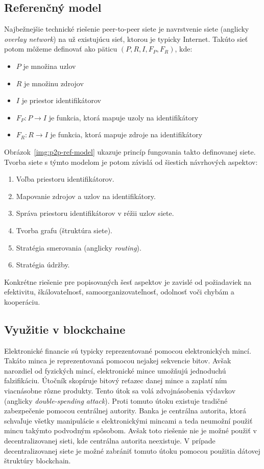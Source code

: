 \subsection{Referenčný model}
Najbežnejšie technické riešenie peer-to-peer siete je navrstvenie siete (anglicky \textit{overlay network}) na už existujúcu sieť, ktorou je typicky Internet. Takúto sieť potom môžeme definovať ako päticu $(P,R,I,F_P,F_R)$, kde:
\begin{itemize}
	\item $P$ je množina uzlov
	\item $R$ je množinu zdrojov
	\item $I$ je priestor identifikátorov
	\item $F_P: P \rightarrow I$ je funkcia, ktorá mapuje uzoly na identifikátory
	\item $F_R: R \rightarrow I$ je funkcia, ktorá mapuje zdroje na identifikátory
\end{itemize}

Obrázok~\ref{img:p2p-ref-model} ukazuje princíp fungovania takto definovanej siete. Tvorba siete s týmto modelom je potom závislá od šiestich návrhových aspektov:
\begin{enumerate}
	\item Voľba priestoru identifikátorov.
	\item Mapovanie zdrojov a uzlov na identifikátory.
	\item Správa priestoru identifikátorov v réžii uzlov siete.
	\item Tvorba grafu (štruktúra siete).
	\item Stratégia smerovania (anglicky \textit{routing}).
	\item Stratégia údržby.
\end{enumerate}
Konkrétne riešenie pre popisovaných šesť aspektov je zavislé od požiadaviek na efektivitu, škálovateľnosť, samoorganizovateľnosť, odolnosť voči chybám a kooperáciu.~\cite{p2pEssence}

\subsection{Využitie v blockchaine}

Elektronické financie sú typicky reprezentované pomocou elektronických mincí. Takáto minca je reprezentovaná pomocou nejakej sekvencie bitov. Avšak narozdiel od fyzických mincí, elektronické mince umožňujú jednoduchú falzifikáciu. Útočník skopíruje bitový reťazec danej mince a zaplatí ním viacnásobne rôzne produkty. Tento útok sa volá zdvojnásobenia výdavkov (anglicky \textit{double-spending attack}). Proti tomuto útoku existuje tradičné zabezpečenie pomocou centrálnej autority. Banka je centrálna autorita, ktorá schvaľuje všetky manipulácie s elektronickými mincami a teda neumožní použiť mincu takýmto podvodným spôsobom. Avšak toto riešenie nie je možné použiť v decentralizovanej sieti, kde centrálna autorita neexistuje. V prípade decentralizovanej siete je možné zabrániť tomuto útoku pomocou použitia dátovej štruktúry blockchain.~\cite{doubleSpending}

